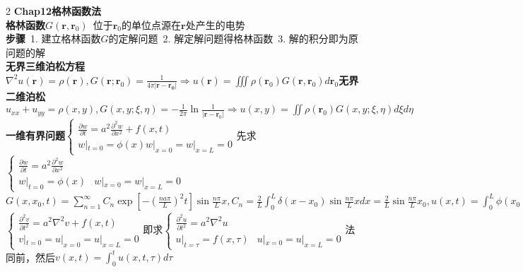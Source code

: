 \documentclass[10pt,a4paper]{article}
\begin{document}
\begin{multicols}{2}
\textbf{Chap12格林函数法}\\
\textbf{格林函数}$G(\bm{r},\bm{r}_0)$~位于$\bm{r}_0$的单位点源在$\bm{r}$处产生的电势\\
\tiny\textbf{步骤}~1. 建立格林函数$G$的定解问题~2. 解定解问题得格林函数~3. 解的积分即为原问题的解\\
\textbf{无界三维泊松方程}$\nabla^2u(\bm{r})=\rho(\bm{r}),G(\bm{r};\bm{r}_0)=\frac{1}{4\pi|\bm{r}-\bm{r_0}|}\Longrightarrow u(\bm{r})=\iiint\rho(\bm{r}_0)G(\bm{r},\bm{r}_0)d\bm{r}_0$\textbf{无界二维泊松}$u_{xx}+u_{yy}=\rho(x,y),G(x,y;\xi,\eta)=-\frac{1}{2\pi}\ln\frac{1}{|\bm{r}-\bm{r}_0|}\Longrightarrow u(x,y)=\iint\rho(\bm{r}_0)G(x,y;\xi,\eta)d\xi d\eta$\\
\textbf{一维有界问题}$\left\{\begin{array}{l}\frac{\partial w}{\partial t}=a^2\frac{\partial^2w}{\partial x^2}+f(x,t)\\w|_{t=0}=\phi(x)w|_{x=0}=w|_{x=L}=0\end{array}\right.$先求$\left\{\begin{array}{ll}\frac{\partial w}{\partial t}=a^2\frac{\partial^2w}{\partial x^2}\\w|_{t=0}=\phi(x)&w|_{x=0}=w|_{x=L}=0\end{array}\right.$\\
\indent$G(x,x_0,t)=\sum_{n=1}^{\infty}C_n\exp[-(\frac{na\pi}{L})^2t]\sin\frac{n\pi}{L}x,C_n=\frac{2}{L}\int_0^L\delta(x-x_0)\sin\frac{n\pi}{L}xdx=\frac{2}{L}\sin\frac{n\pi}{L}x_0,u(x,t)=\int_0^L\phi(x_0)G(x,x_0,t)dx_0=\frac{2}{L}\int_0^L[\sum_{n=1}^{\infty}e^{-(\frac{na\pi}{L})^2t}\sin\frac{n\pi}{L}x\sin\frac{n\pi}{L}x_0]\phi(x_0)dx_0$\\
$\left\{\begin{array}{l}\frac{\partial^2v}{\partial t^2}=a^2\nabla^2v+f(x,t)\\v|_{t=0}=u|_{x=0}=u|_{x=L}=0\end{array}\right.$即求$\left\{\begin{array}{ll}\frac{\partial^2u}{\partial t^2}=a^2\nabla^2u\\u|_{t=\tau}=f(x,\tau)&u|_{x=0}=u|_{x=L}=0\end{array}\right.$法同前，然后$v(x,t)=\int_0^tu(x,t,\tau)d\tau$\\

\end{multicols}
\end{document}
